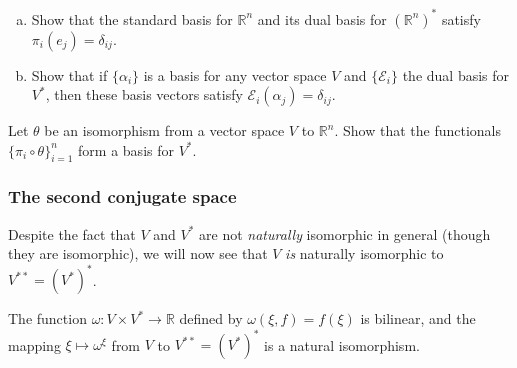 \documentclass[12pt,letterpaper,reqno]{article}
\numberwithin{equation}{section}
\newcommand{\ti}[1]{\textit{#1}}
\begin{document}
\begin{exercise} \hspace{10cm}
	\begin{enumerate}[(a)]
		\item Show that the standard basis for $\mathbb{R}^n$ and its dual basis for $(\mathbb{R}^n)^*$ satisfy $\pi_i(e_j)=\delta_{ij}$.
		\item Show that if $\{\alpha_i\}$ is a basis for any vector space $V$ and $\{\mathscr{E}_i\}$ the dual basis for $V^*$, then these basis vectors satisfy $\mathscr{E}_i(\alpha_j)=\delta_{ij}$. 
	\end{enumerate}	
\end{exercise}

\begin{exercise}
Let $\theta$ be an isomorphism from a vector space $V$ to $\mathbb{R}^n$. Show that the functionals $\{\pi_i \circ \theta\}_{i=1}^n$ form a basis for $V^*$.	
\end{exercise}



\subsubsection{The second conjugate space}
Despite the fact that $V$ and $V^*$ are not \ti{naturally} isomorphic in general (though they are isomorphic), we will now see that $V$ \ti{is} naturally isomorphic to $V^{**}=(V^*)^*$.

\begin{thm}
	The function $\omega:V \times V^* \to \mathbb{R}$ defined by $\omega(\xi,f)=f(\xi)$ is bilinear, and the mapping $\xi \mapsto \omega^\xi$ from $V$ to $V^{**}=(V^*)^*$ is a natural isomorphism.
\end{thm}
\end{document}
